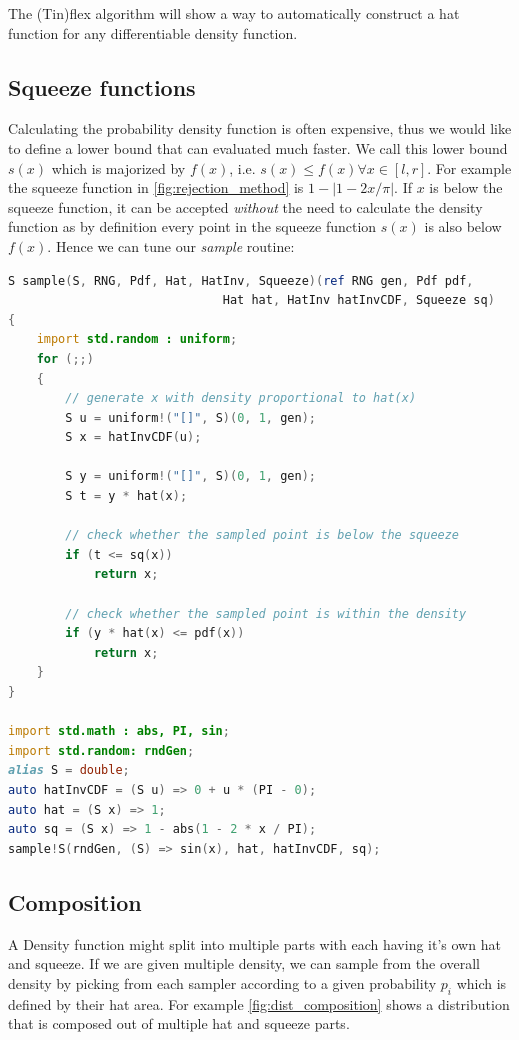 \documentclass[]{article}
\begin{document}
The (Tin)flex algorithm will show a way to automatically construct a hat function for any differentiable density function.

\subsection{Squeeze functions}

Calculating the probability density function is often expensive, thus we would like to define a lower bound that can evaluated much faster. We call this lower bound $s(x)$ which is majorized by $f(x)$, i.e. $s(x) \leq f(x) \forall x \in [l, r]$. For example the squeeze function in \autoref{fig:rejection_method} is $1 - |1 - 2x / \pi |$. If $x$ is below the squeeze function, it can be accepted \textit{without} the need to calculate the density function as by definition every point in the squeeze function $s(x)$ is also below $f(x)$. Hence we can tune our \textit{sample} routine:

\begin{minipage}{0.9\linewidth}
\begin{lstlisting}[language=D]
S sample(S, RNG, Pdf, Hat, HatInv, Squeeze)(ref RNG gen, Pdf pdf,
                              Hat hat, HatInv hatInvCDF, Squeeze sq)
{
    import std.random : uniform;
    for (;;)
    {
        // generate x with density proportional to hat(x)
        S u = uniform!("[]", S)(0, 1, gen);
        S x = hatInvCDF(u);

        S y = uniform!("[]", S)(0, 1, gen);
        S t = y * hat(x);

        // check whether the sampled point is below the squeeze
        if (t <= sq(x))
            return x;

        // check whether the sampled point is within the density
        if (y * hat(x) <= pdf(x))
            return x;
    }
}

import std.math : abs, PI, sin;
import std.random: rndGen;
alias S = double;
auto hatInvCDF = (S u) => 0 + u * (PI - 0);
auto hat = (S x) => 1;
auto sq = (S x) => 1 - abs(1 - 2 * x / PI);
sample!S(rndGen, (S) => sin(x), hat, hatInvCDF, sq);
\end{lstlisting}
\end{minipage}


\subsection{Composition}

A Density function might split into multiple parts with each having it's own hat and squeeze. If we are given multiple density, we can sample from the overall density by picking from each sampler according to a given probability $p_i$ which is defined by their hat area. For example \autoref{fig:dist_composition} shows a distribution that is composed out of multiple hat and squeeze parts.
\end{document}
